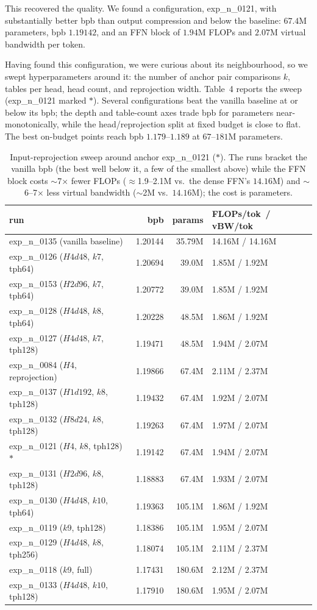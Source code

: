 \documentclass[11pt]{article}
\begin{document}
This recovered the quality. We found a configuration, exp\_n\_0121, with substantially better
bpb than output compression and below the baseline: $67.4$M parameters, bpb $1.19142$, and an
FFN block of $1.94$M FLOPs and $2.07$M virtual bandwidth per token.

Having found this configuration, we were curious about its neighbourhood, so we swept
hyperparameters around it: the number of anchor pair comparisons $k$, tables per head, head count, and reprojection
width. Table~4 reports the sweep (exp\_n\_0121 marked $\ast$). Several configurations beat the
vanilla baseline at or below its bpb; the depth and table-count axes trade bpb for parameters
near-monotonically, while the head/reprojection split at fixed budget is close to flat. The
best on-budget points reach bpb $1.179$--$1.189$ at $67$--$181$M parameters.

\begin{table}[h]\centering
\begin{tabular}{lrrl}
\toprule
run & bpb & params & FLOPs/tok \,/\, vBW/tok \\
\midrule
exp\_n\_0135 (vanilla baseline) & 1.20144 & 35.79M & 14.16M / 14.16M \\
exp\_n\_0126 ($H4d48$, $k7$, tph64) & 1.20694 & 39.0M & 1.85M / 1.92M \\
exp\_n\_0153 ($H2d96$, $k7$, tph64) & 1.20772 & 39.0M & 1.85M / 1.92M \\
exp\_n\_0128 ($H4d48$, $k8$, tph64) & 1.20228 & 48.5M & 1.86M / 1.92M \\
exp\_n\_0127 ($H4d48$, $k7$, tph128) & 1.19471 & 48.5M & 1.94M / 2.07M \\
exp\_n\_0084 ($H4$, reprojection) & 1.19866 & 67.4M & 2.11M / 2.37M \\
exp\_n\_0137 ($H1d192$, $k8$, tph128) & 1.19432 & 67.4M & 1.92M / 2.07M \\
exp\_n\_0132 ($H8d24$, $k8$, tph128) & 1.19263 & 67.4M & 1.97M / 2.07M \\
exp\_n\_0121 ($H4$, $k8$, tph128) $\ast$ & 1.19142 & 67.4M & 1.94M / 2.07M \\
exp\_n\_0131 ($H2d96$, $k8$, tph128) & 1.18883 & 67.4M & 1.93M / 2.07M \\
exp\_n\_0130 ($H4d48$, $k10$, tph64) & 1.19363 & 105.1M & 1.86M / 1.92M \\
exp\_n\_0119 ($k9$, tph128) & 1.18386 & 105.1M & 1.95M / 2.07M \\
exp\_n\_0129 ($H4d48$, $k8$, tph256) & 1.18074 & 105.1M & 2.11M / 2.37M \\
exp\_n\_0118 ($k9$, full) & 1.17431 & 180.6M & 2.12M / 2.37M \\
exp\_n\_0133 ($H4d48$, $k10$, tph128) & 1.17910 & 180.6M & 1.95M / 2.07M \\
\bottomrule
\end{tabular}
\caption{Input-reprojection sweep around anchor exp\_n\_0121 ($\ast$). The runs bracket the
vanilla bpb (the best well below it, a few of the smallest above) while the FFN block costs
$\sim$7$\times$ fewer FLOPs ($\approx$1.9--2.1M vs.\ the dense FFN's $14.16$M) and $\sim$6--7$\times$ less
virtual bandwidth ($\sim$2M vs.\ $14.16$M); the cost is parameters.}
\end{table}
\end{document}

